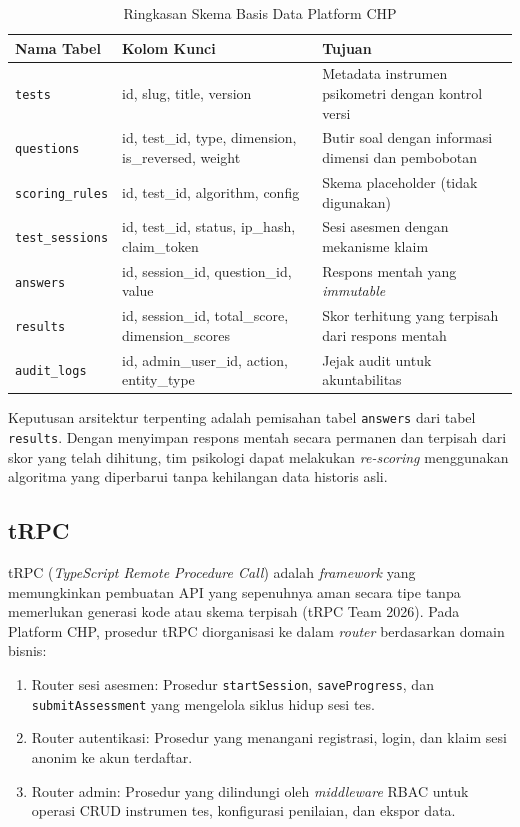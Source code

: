 \begin{table}[htbp]
  \centering
  \caption{Ringkasan Skema Basis Data Platform CHP}
  \label{tab:ringkasan-skema}
  \begin{tabularx}{\textwidth}{@{}p{3cm} p{4.5cm} X@{}}
    \toprule
    \textbf{Nama Tabel} & \textbf{Kolom Kunci} & \textbf{Tujuan} \\
    \midrule
    \texttt{tests} & id, slug, title, version & Metadata instrumen psikometri dengan kontrol versi \\
    \texttt{questions} & id, test\_id, type, dimension, is\_reversed, weight & Butir soal dengan informasi dimensi dan pembobotan \\
    \texttt{scoring\_rules} & id, test\_id, algorithm, config & Skema placeholder (tidak digunakan) \\
    \texttt{test\_sessions} & id, test\_id, status, ip\_hash, claim\_token & Sesi asesmen dengan mekanisme klaim \\
    \texttt{answers} & id, session\_id, question\_id, value & Respons mentah yang \textit{immutable} \\
    \texttt{results} & id, session\_id, total\_score, dimension\_scores & Skor terhitung yang terpisah dari respons mentah \\
    \texttt{audit\_logs} & id, admin\_user\_id, action, entity\_type & Jejak audit untuk akuntabilitas \\
    \bottomrule
  \end{tabularx}
\end{table}

Keputusan arsitektur terpenting adalah pemisahan tabel \texttt{answers} dari tabel \texttt{results}. Dengan menyimpan respons mentah secara permanen dan terpisah dari skor yang telah dihitung, tim psikologi dapat melakukan \textit{re-scoring} menggunakan algoritma yang diperbarui tanpa kehilangan data historis asli.

\subsection{tRPC}
\label{subsec:trpc}

tRPC (\textit{TypeScript Remote Procedure Call}) adalah \textit{framework} yang memungkinkan pembuatan API yang sepenuhnya aman secara tipe tanpa memerlukan generasi kode atau skema terpisah (tRPC Team 2026). Pada Platform CHP, prosedur tRPC diorganisasi ke dalam \textit{router} berdasarkan domain bisnis:

\begin{enumerate}[leftmargin=2cm]
  \item Router sesi asesmen: Prosedur \texttt{startSession}, \texttt{saveProgress}, dan \texttt{submitAssessment} yang mengelola siklus hidup sesi tes.
  \item Router autentikasi: Prosedur yang menangani registrasi, login, dan klaim sesi anonim ke akun terdaftar.
  \item Router admin: Prosedur yang dilindungi oleh \textit{middleware} RBAC untuk operasi CRUD instrumen tes, konfigurasi penilaian, dan ekspor data.
\end{enumerate}

